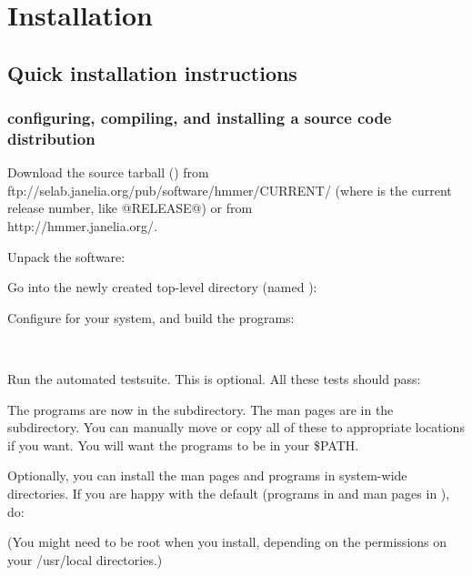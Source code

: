 \section{Installation}
\label{section:installation}

\subsection{Quick installation instructions}

\subsubsection{configuring, compiling, and installing a source code distribution}

Download the source tarball () from 
                  {ftp://selab.janelia.org/pub/software/hmmer/CURRENT/}
(where  is the current release number, like @RELEASE@)
or from \\
                  {http://hmmer.janelia.org/}.

Unpack the software:


Go into the newly created top-level directory (named ):


Configure for your system, and build the programs:

\\

Run the automated testsuite. This is optional.  All these tests should
pass:


The programs are now in the  subdirectory. The man pages
are in the  subdirectory. You can manually
move or copy all of these to appropriate locations if you want. You
will want the programs to be in your \$PATH.

Optionally, you can install the man pages and programs in system-wide
directories. If you are happy with the default (programs in
 and man pages in ),
do:


(You might need to be root when you install, depending on the
permissions on your /usr/local directories.)

